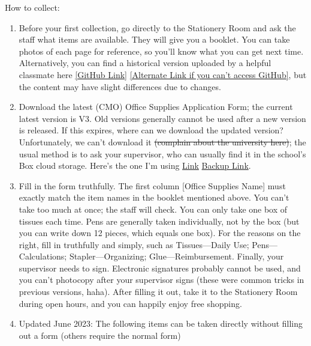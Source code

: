 \hfill\break
How to collect:
\begin{enumerate}
    \item Before your first collection, go directly to the Stationery Room and ask the staff what items are available. They will give you a booklet. You can take photos of each page for reference, so you’ll know what you can get next time. Alternatively, you can find a historical version uploaded by a helpful classmate here \href{https://github.com/xp-pgrs-unofficial-guide/xp_pgrs_unofficial_guide/tree/main/fileshare}{[GitHub Link]} \href{https://gitee.com/kaiwu-astro/xp_pgrs_unofficial_guide/tree/main/fileshare}{[Alternate Link if you can't access GitHub]}, but the content may have slight differences due to changes.
    \item Download the latest (CMO) Office Supplies Application Form; the current latest version is V3. Old versions generally cannot be used after a new version is released. If this expires, where can we download the updated version? Unfortunately, we can't download it \sout{(complain about the university here)}; the usual method is to ask your supervisor, who can usually find it in the school's Box cloud storage. Here's the one I'm using \href{https://github.com/xp-pgrs-unofficial-guide/xp_pgrs_unofficial_guide/tree/main/fileshare}{Link} \href{https://gitee.com/kaiwu-astro/xp_pgrs_unofficial_guide/tree/main/fileshare}{Backup Link}.
    \item Fill in the form truthfully. The first column [Office Supplies Name] must exactly match the item names in the booklet mentioned above. You can't take too much at once; the staff will check. You can only take one box of tissues each time. Pens are generally taken individually, not by the box (but you can write down 12 pieces, which equals one box). For the reasons on the right, fill in truthfully and simply, such as Tissues—Daily Use; Pens—Calculations; Stapler—Organizing; Glue—Reimbursement. Finally, your supervisor needs to sign. Electronic signatures probably cannot be used, and you can't photocopy after your supervisor signs (these were common tricks in previous versions, haha). After filling it out, take it to the Stationery Room during open hours, and you can happily enjoy free shopping.
    \item Updated June 2023: The following items can be taken directly without filling out a form (others require the normal form)
\end{enumerate}

